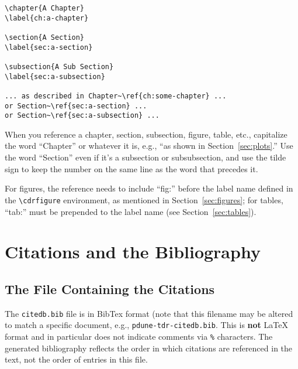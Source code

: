 \begin{verbatim}
\chapter{A Chapter}
\label{ch:a-chapter}

\section{A Section}
\label{sec:a-section}

\subsection{A Sub Section}
\label{sec:a-subsection}

... as described in Chapter~\ref{ch:some-chapter} ... 
or Section~\ref{sec:a-section} ... 
or Section~\ref{sec:a-subsection} ...

\end{verbatim}


When you reference a chapter, section, subsection, figure, table,
etc., capitalize the word ``Chapter'' or whatever it is, e.g., ``as
shown in Section~\ref{sec:plots}.''
Use the word ``Section'' even if it's a subsection or subsubsection,
and use the tilde sign to keep the number on the same line as the word
that precedes it.

For figures, the reference needs to include ``fig:'' before the label name defined in the \verb|\cdrfigure| environment, as mentioned in Section~\ref{sec:figures}; for tables, ``tab:'' must be prepended to the label name (see Section~\ref{sec:tables}).


\section{Citations and the Bibliography}

\subsection{The File Containing the Citations}

The \texttt{citedb.bib} file is in BibTex format  (note that this filename may be altered to match a specific document, e.g., \texttt{pdune-tdr-citedb.bib}.
This is \textbf{not} \LaTeX{} format and in particular does not
indicate comments via \texttt{\%} characters.
The
generated bibliography reflects the order in which citations are referenced in the text, not the order of entries in this file.

